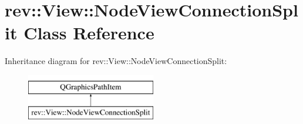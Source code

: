 \hypertarget{classrev_1_1_view_1_1_node_view_connection_split}{}\section{rev\+::View\+::Node\+View\+Connection\+Split Class Reference}
\label{classrev_1_1_view_1_1_node_view_connection_split}
Inheritance diagram for rev\+::View\+::Node\+View\+Connection\+Split\+:\begin{figure}[H]
\begin{center}
\leavevmode
\includegraphics[height=2.000000cm]{classrev_1_1_view_1_1_node_view_connection_split}
\end{center}
\end{figure}
